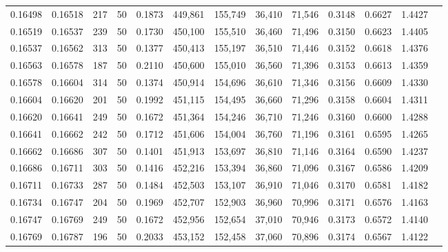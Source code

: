\begin{tabular}{rrrrrrrrrrrrr}
0.16498 & 0.16518 &   217 &  50 &                                     0.1873 & 449,861 & 155,749 &  36,410 &  71,546 & 0.3148 & 0.6627 & 1.4427 \\
0.16519 & 0.16537 &   239 &  50 &                                     0.1730 & 450,100 & 155,510 &  36,460 &  71,496 & 0.3150 & 0.6623 & 1.4405 \\
0.16537 & 0.16562 &   313 &  50 &                                     0.1377 & 450,413 & 155,197 &  36,510 &  71,446 & 0.3152 & 0.6618 & 1.4376 \\
0.16563 & 0.16578 &   187 &  50 &                                     0.2110 & 450,600 & 155,010 &  36,560 &  71,396 & 0.3153 & 0.6613 & 1.4359 \\
0.16578 & 0.16604 &   314 &  50 &                                     0.1374 & 450,914 & 154,696 &  36,610 &  71,346 & 0.3156 & 0.6609 & 1.4330 \\
0.16604 & 0.16620 &   201 &  50 &                                     0.1992 & 451,115 & 154,495 &  36,660 &  71,296 & 0.3158 & 0.6604 & 1.4311 \\
0.16620 & 0.16641 &   249 &  50 &                                     0.1672 & 451,364 & 154,246 &  36,710 &  71,246 & 0.3160 & 0.6600 & 1.4288 \\
0.16641 & 0.16662 &   242 &  50 &                                     0.1712 & 451,606 & 154,004 &  36,760 &  71,196 & 0.3161 & 0.6595 & 1.4265 \\
0.16662 & 0.16686 &   307 &  50 &                                     0.1401 & 451,913 & 153,697 &  36,810 &  71,146 & 0.3164 & 0.6590 & 1.4237 \\
0.16686 & 0.16711 &   303 &  50 &                                     0.1416 & 452,216 & 153,394 &  36,860 &  71,096 & 0.3167 & 0.6586 & 1.4209 \\
0.16711 & 0.16733 &   287 &  50 &                                     0.1484 & 452,503 & 153,107 &  36,910 &  71,046 & 0.3170 & 0.6581 & 1.4182 \\
0.16734 & 0.16747 &   204 &  50 &                                     0.1969 & 452,707 & 152,903 &  36,960 &  70,996 & 0.3171 & 0.6576 & 1.4163 \\
0.16747 & 0.16769 &   249 &  50 &                                     0.1672 & 452,956 & 152,654 &  37,010 &  70,946 & 0.3173 & 0.6572 & 1.4140 \\
0.16769 & 0.16787 &   196 &  50 &                                     0.2033 & 453,152 & 152,458 &  37,060 &  70,896 & 0.3174 & 0.6567 & 1.4122 \\

\end{tabular}
